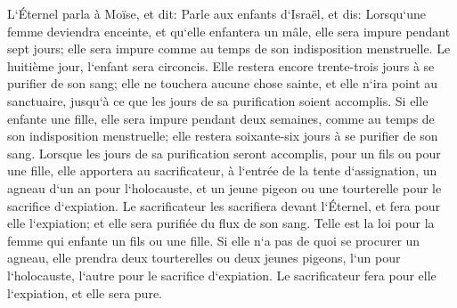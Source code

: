 \verse L`Éternel parla à Moïse, et dit: 
\verse Parle aux enfants d`Israël, et dis: Lorsqu`une femme deviendra enceinte, et qu`elle enfantera un mâle, elle sera impure pendant sept jours; elle sera impure comme au temps de son indisposition menstruelle. 
\verse Le huitième jour, l`enfant sera circoncis. 
\verse Elle restera encore trente-trois jours à se purifier de son sang; elle ne touchera aucune chose sainte, et elle n`ira point au sanctuaire, jusqu`à ce que les jours de sa purification soient accomplis. 
\verse Si elle enfante une fille, elle sera impure pendant deux semaines, comme au temps de son indisposition menstruelle; elle restera soixante-six jours à se purifier de son sang. 
\verse Lorsque les jours de sa purification seront accomplis, pour un fils ou pour une fille, elle apportera au sacrificateur, à l`entrée de la tente d`assignation, un agneau d`un an pour l`holocauste, et un jeune pigeon ou une tourterelle pour le sacrifice d`expiation. 
\verse Le sacrificateur les sacrifiera devant l`Éternel, et fera pour elle l`expiation; et elle sera purifiée du flux de son sang. Telle est la loi pour la femme qui enfante un fils ou une fille. 
\verse Si elle n`a pas de quoi se procurer un agneau, elle prendra deux tourterelles ou deux jeunes pigeons, l`un pour l`holocauste, l`autre pour le sacrifice d`expiation. Le sacrificateur fera pour elle l`expiation, et elle sera pure. 

